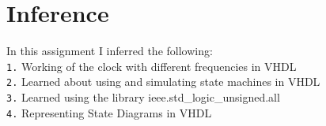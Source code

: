\documentclass[12pt]{article}
\begin{document}
\section{Inference}
In this assignment I inferred the following:\\
\verb|1.| Working of the clock with different frequencies in VHDL\\
\verb|2.| Learned about using and simulating state machines in VHDL  \\
\verb|3.| Learned using the library \textcolor{STD}{ieee.std\_logic\_unsigned}.\textcolor{keyword}{all}\\
\verb|4.| Representing State Diagrams in VHDL \\
\end{document}
